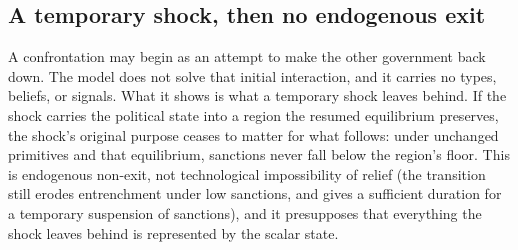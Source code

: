 \subsection{A temporary shock, then no endogenous exit}
\label{sec:finite-episode}
A confrontation may begin as an attempt to make the other government back
down. The model does not solve that initial interaction, and it carries no
types, beliefs, or signals. What it shows is what a temporary shock
leaves behind. If the shock carries the political state into a region the
resumed equilibrium preserves, the shock's original purpose ceases to
matter for what follows: under unchanged primitives and that equilibrium,
sanctions never fall below the region's floor. This is endogenous non-exit,
not technological impossibility of relief (the transition still erodes
entrenchment under low sanctions, and  gives a
sufficient duration for a temporary suspension of sanctions), and it presupposes that
everything the shock leaves behind is represented by the scalar state.

